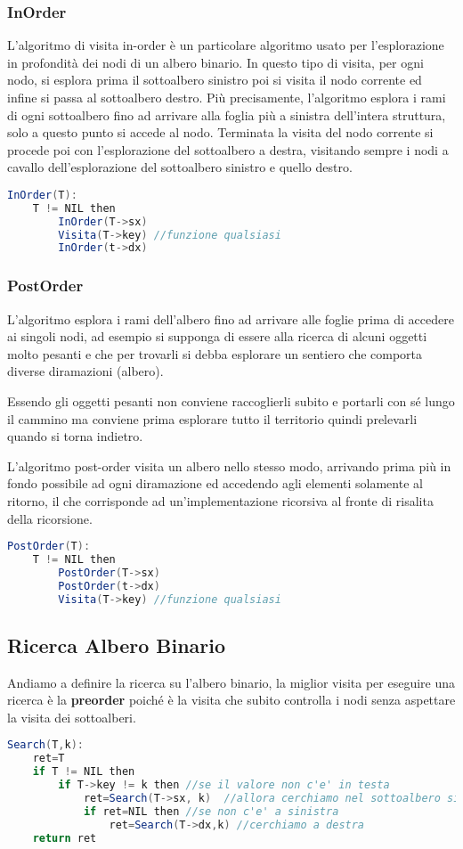 \subsubsection{InOrder}
L'algoritmo di visita in-order è un particolare algoritmo usato per l'esplorazione in profondità dei nodi di un albero binario. In questo tipo di visita, per ogni nodo, si esplora prima il sottoalbero sinistro poi si visita il nodo corrente ed infine si passa al sottoalbero destro. Più precisamente, l'algoritmo esplora i rami di ogni sottoalbero fino ad arrivare alla foglia più a sinistra dell'intera struttura, solo a questo punto si accede al nodo. Terminata la visita del nodo corrente si procede poi con l'esplorazione del sottoalbero a destra, visitando sempre i nodi a cavallo dell'esplorazione del sottoalbero sinistro e quello destro. 
\begin{lstlisting}[language=Java]
InOrder(T):
	T != NIL then
		InOrder(T->sx)
		Visita(T->key) //funzione qualsiasi
		InOrder(t->dx)	
\end{lstlisting}

\subsubsection{PostOrder}
L'algoritmo esplora i rami dell'albero fino ad arrivare alle foglie prima di accedere ai singoli nodi, ad esempio si supponga di essere alla ricerca di alcuni oggetti molto pesanti e che per trovarli si debba esplorare un sentiero che comporta diverse diramazioni (albero).

Essendo gli oggetti pesanti non conviene raccoglierli subito e portarli con sé lungo il cammino ma conviene prima esplorare tutto il territorio quindi prelevarli quando si torna indietro.

L'algoritmo post-order visita un albero nello stesso modo, arrivando prima più in fondo possibile ad ogni diramazione ed accedendo agli elementi solamente al ritorno, il che corrisponde ad un'implementazione ricorsiva al fronte di risalita della ricorsione. 
\begin{lstlisting}[language=Java]
PostOrder(T):
	T != NIL then
		PostOrder(T->sx)
		PostOrder(t->dx)	
		Visita(T->key) //funzione qualsiasi
\end{lstlisting}

\subsection{Ricerca Albero Binario}
Andiamo a definire la ricerca su l'albero binario, la miglior visita per eseguire una ricerca è la \textbf{preorder} poiché è la visita che subito controlla i nodi senza aspettare la visita dei sottoalberi.
\begin{lstlisting}[language=Java]
Search(T,k):
	ret=T
	if T != NIL then
		if T->key != k then //se il valore non c'e' in testa
			ret=Search(T->sx, k)  //allora cerchiamo nel sottoalbero sinistro
			if ret=NIL then //se non c'e' a sinistra
				ret=Search(T->dx,k) //cerchiamo a destra
	return ret
\end{lstlisting}
